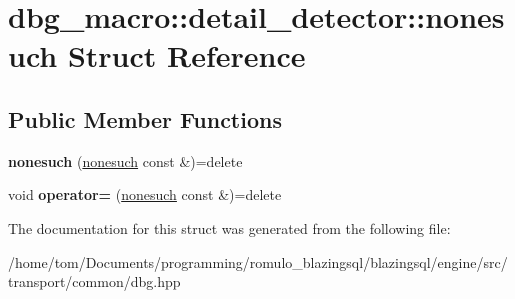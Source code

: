 \hypertarget{structdbg__macro_1_1detail__detector_1_1nonesuch}{}\section{dbg\+\_\+macro\+:\+:detail\+\_\+detector\+:\+:nonesuch Struct Reference}
\label{structdbg__macro_1_1detail__detector_1_1nonesuch}
\subsection*{Public Member Functions}
\begin{DoxyCompactItemize}
\item 
\mbox{\label{structdbg__macro_1_1detail__detector_1_1nonesuch_ad58c6c5f20d35268c99aeee0caefbcf4}} 
{\bfseries nonesuch} (\hyperlink{structdbg__macro_1_1detail__detector_1_1nonesuch}{nonesuch} const \&)=delete
\item 
\mbox{\label{structdbg__macro_1_1detail__detector_1_1nonesuch_a52a82dd93d30847d3b1aae2cbcb55350}} 
void {\bfseries operator=} (\hyperlink{structdbg__macro_1_1detail__detector_1_1nonesuch}{nonesuch} const \&)=delete
\end{DoxyCompactItemize}


The documentation for this struct was generated from the following file\+:\begin{DoxyCompactItemize}
\item 
/home/tom/\+Documents/programming/romulo\+\_\+blazingsql/blazingsql/engine/src/transport/common/dbg.\+hpp\end{DoxyCompactItemize}
